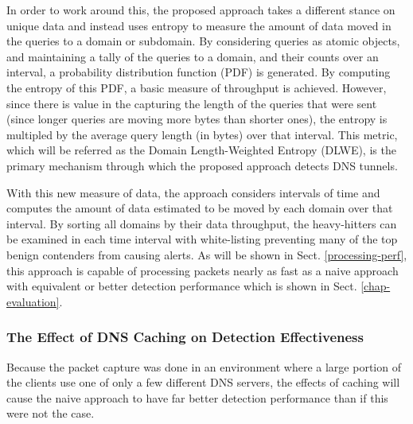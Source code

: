 \documentclass{llncs}
\begin{document}
In order to work around this, the proposed approach takes a different stance on
unique data and instead uses entropy to measure the amount of data moved in the
queries to a domain or subdomain. By considering queries as atomic objects, and
maintaining a tally of the queries to a domain, and their counts over an
interval, a probability distribution function (PDF) is generated. By computing
the entropy of this PDF, a basic measure of throughput is achieved. However,
since there is value in the capturing the length of the queries that were sent
(since longer queries are moving more bytes than shorter ones), the entropy is
multipled by the average query length (in bytes) over that interval. This
metric, which will be referred as the Domain Length-Weighted Entropy (DLWE), is
the primary mechanism through which the proposed approach detects DNS tunnels.

With this new measure of data, the approach considers intervals of time and
computes the amount of data estimated to be moved by each domain over that
interval. By sorting all domains by their data throughput, the heavy-hitters can
be examined in each time interval with white-listing preventing many of the top benign
contenders from causing alerts. As will be shown in Sect. \ref{processing-perf}, this approach is capable of
processing packets nearly as fast as a naive approach with equivalent or better
detection performance which is shown in Sect. \ref{chap-evaluation}.

\subsubsection{The Effect of DNS Caching on Detection Effectiveness}
\label{dns-caching}

Because the packet capture was done in an environment where a large portion of
the clients use one of only a few different DNS servers, the effects of caching
will cause the naive approach to have far better detection performance than if this
were not the case.
\end{document}

